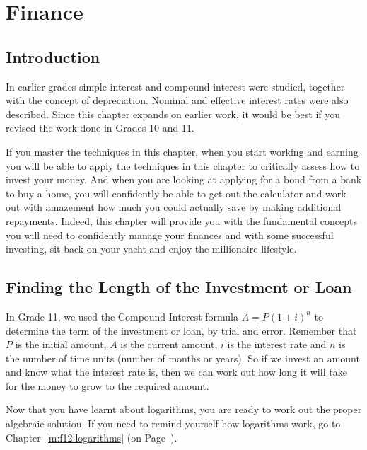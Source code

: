 \chapter{Finance}
\label{m:f12}

\section{Introduction}
In earlier grades simple interest and compound interest were studied, together with the concept of depreciation. Nominal and effective interest rates were also described. Since this chapter expands on earlier work, it would be best if you revised the work done in Grades 10 and 11.%

If you master the techniques in this chapter, when you start working and earning you will be able to apply the techniques in this chapter to critically assess how to invest your money. And when you are looking at applying for a bond from a bank to buy a home, you will confidently be able to get out the calculator and work out with amazement how much you could actually save by making additional repayments. Indeed, this chapter will provide you with the fundamental concepts you will need to confidently manage your finances and with some successful investing, sit back on your yacht and enjoy the millionaire lifestyle.

\section{Finding the Length of the Investment or Loan}
\label{sec:m:f12:term}


In Grade 11, we used the Compound Interest formula $A = P(1 + i)^n$ to determine the term of the investment or loan, by trial and error. Remember that $P$ is the initial amount, $A$ is the current amount, $i$ is the interest rate and $n$ is the number of time units (number of months or years). So if we invest an amount and know what the interest rate is, then we can work out how long it will take for the money to grow to the required amount.

Now that you have learnt about logarithms, you are ready to work out the proper algebraic solution. If you need to remind yourself how logarithms work, go to Chapter~\ref{m:f12:logarithms} (on Page~\pageref{m:f12:logarithms}).

